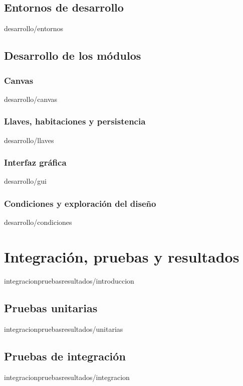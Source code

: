 \documentclass[epsbased,copyright,final,printable,covers,extendedindex,firstnumbered,tfg,gnuplot]{tfgtfmthesisuam}
\begin{document}
	\section{Entornos de desarrollo\label{SEC:ENTORNOS}}{desarrollo/entornos}
	\section{Desarrollo de los módulos\label{SEC:DEVMODULOS}}
		\subsection{Canvas\label{SUBSEC:DEVCANVAS}}{desarrollo/canvas}
		\subsection{Llaves, habitaciones y persistencia\label{SUBSEC:DEVLLAVES}}{desarrollo/llaves}
		\subsection{Interfaz gráfica\label{SUBSEC:DEVGUI}}{desarrollo/gui}
		\subsection{Condiciones y exploración del diseño\label{SUBSEC:CONDICIONES}}{desarrollo/condiciones}

\chapter{Integración, pruebas y resultados\label{CAP:INTEGRACIONPRUEBASYRESULTADOS}}{integracionpruebasresultados/introduccion}
	\section{Pruebas unitarias\label{SEC:PRUEBASUNITARIAS}}{integracionpruebasresultados/unitarias}
	\section{Pruebas de integración\label{SEC:PRUEBASINTEGRACION}}{integracionpruebasresultados/integracion}
\end{document}
